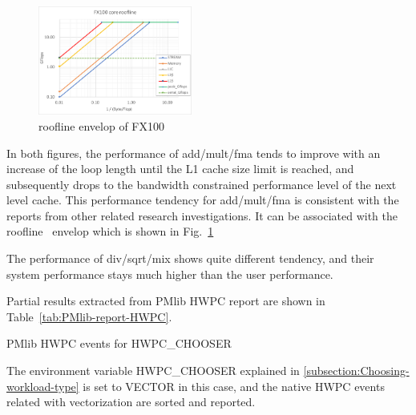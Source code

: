 \documentclass[conference]{IEEEtran}
\begin{document}
\begin{figure}[tb]
\includegraphics[width=0.45\textwidth]{figs/roofline-fx100.pdf}
\caption{roofline envelop of FX100}
\label{fig:roofline-fx100}
\end{figure}

In both figures,
the performance of add/mult/fma tends to improve with an increase of
the loop length until the L1 cache size limit is reached,
and subsequently drops to the bandwidth constrained performance level
of the next level cache.
This performance tendency for add/mult/fma is consistent with the reports
from other related research investigations.
It can be associated with the roofline~\cite{Williams:2009}
envelop which is shown in Fig.~\ref{fig:roofline-fx100}

The performance of div/sqrt/mix shows quite different tendency, and
their system performance stays much higher than the user performance.

Partial results extracted from PMlib HWPC report are shown
in Table~\ref{tab:PMlib-report-HWPC}.
%
\begin{table}[bt]
\centering
\caption{PMlib HWPC events for HWPC\_CHOOSER}
\label{tab:PMlib-report-HWPC}
\scriptsize %
% 

\end{table}
%
The environment variable HWPC\_CHOOSER explained in
\ref{subsection:Choosing-workload-type} is set to VECTOR in this case,
and the native HWPC events related with vectorization are sorted and reported.
\end{document}

